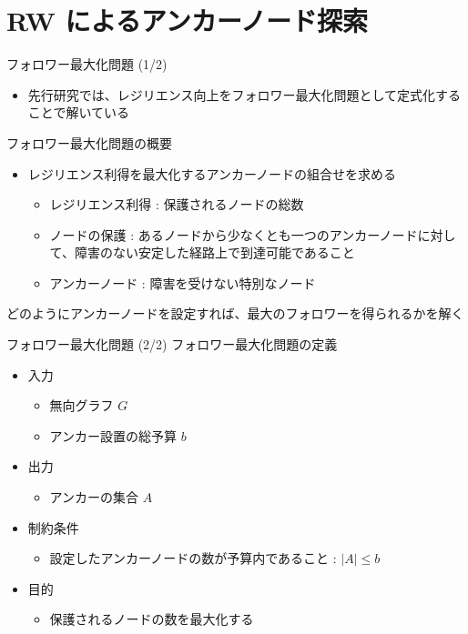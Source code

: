 \documentclass[compress,dvipdfmx,11pt]{beamer}
\begin{document}
\section{RW によるアンカーノード探索}
\label{sec:org0282284}
\begin{frame}[label={sec:orgd25499c}]{フォロワー最大化問題 (1/2)}
\begin{itemize}
\item 先行研究では、レジリエンス向上をフォロワー最大化問題として定式化することで解いている
\end{itemize}

フォロワー最大化問題の概要
\begin{itemize}
\item レジリエンス利得を最大化するアンカーノードの組合せを求める
\begin{itemize}
\item レジリエンス利得 : 保護されるノードの総数
\item ノードの保護 : あるノードから少なくとも一つのアンカーノードに対し
て、障害のない安定した経路上で到達可能であること
\item アンカーノード : 障害を受けない特別なノード
\end{itemize}
\end{itemize}

どのようにアンカーノードを設定すれば、最大のフォロワーを得られるかを解く
\end{frame}
\begin{frame}[label={sec:orged383bc}]{フォロワー最大化問題 (2/2)}
フォロワー最大化問題の定義
\begin{itemize}
\item 入力
\begin{itemize}
\item 無向グラフ \(G\)
\item アンカー設置の総予算 \(b\)
\end{itemize}

\item 出力
\begin{itemize}
\item アンカーの集合 \(A\)
\end{itemize}

\item 制約条件
\begin{itemize}
\item 設定したアンカーノードの数が予算内であること : \(|A| \leq b\)
\end{itemize}

\item 目的
\begin{itemize}
\item 保護されるノードの数を最大化する
\end{itemize}
\end{itemize}

\end{frame}
\end{document}
